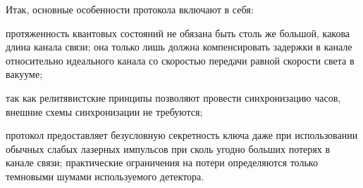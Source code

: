 Итак, основные особенности протокола включают в себя: 
\begin{inparaenum}[\itshape 1\upshape)]
\item протяженность квантовых состояний не обязана быть столь же большой, какова длина канала связи; она только лишь должна компенсировать задержки в канале относительно идеального канала со скоростью передачи равной скорости света в вакууме;
\item так как релитявистские принципы позволяют провести синхронизацию часов, внешние схемы синхронизации не требуются;
\item протокол предоставляет безусловную секретность ключа даже при использовании обычных слабых лазерных импульсов при сколь угодно больших потерях в канале связи; практические ограничения на потери определяются только темновыми шумами используемого детектора.
\end{inparaenum}

\clearpage